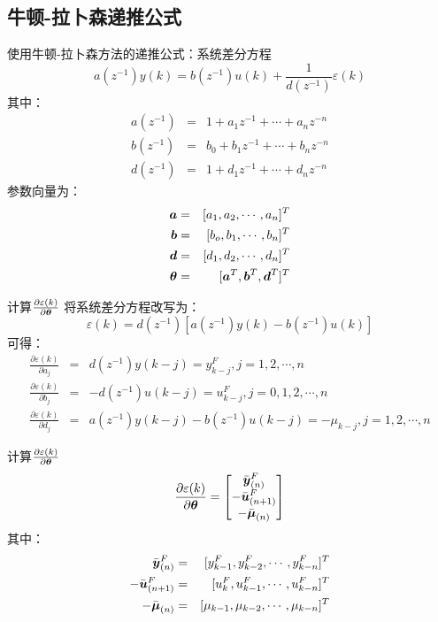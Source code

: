 \subsection{牛顿-拉卜森递推公式}

\begin{frame}{使用牛顿-拉卜森方法的递推公式：系统差分方程}
$$
a(z^{-1})y(k) = b(z^{-1})u(k)+\frac{1}{d(z^{-1})}\varepsilon(k)
$$
其中：
\begin{eqnarray*}
a(z^{-1}) &=&  1+a_1 z^{-1}+\cdots+a_nz^{-n} \\
b(z^{-1}) &=&  b_0+b_1 z^{-1}+\cdots+b_n z^{-n} \\
d(z^{-1}) &=&  1+d_1 z^{-1}+\cdots+d_n z^{-n} 
\end{eqnarray*}
参数向量为：
\begin{eqnarray*}
\boldsymbol{a} &=& [a_1,a_2,\cdots,a_n]^T   \\
\boldsymbol{b} &=& [b_o,b_1,\cdots,b_n]^T   \\
\boldsymbol{d} &=& [d_1,d_2,\cdots,d_n]^T   \\
\boldsymbol{\theta} &=& [\boldsymbol{a}^T,\boldsymbol{b}^T,\boldsymbol{d}^T]^T
\end{eqnarray*}
\end{frame}

\begin{frame}{计算$\frac{\partial\varepsilon(k)}{\partial\boldsymbol{\theta}}$}
将系统差分方程改写为：
$$
\varepsilon(k) = d(z^{-1})[a(z^{-1})y(k)-b(z^{-1})u(k)]
$$
可得：
\begin{eqnarray*}
\frac{\partial\varepsilon(k)}{\partial a_j} &=& d(z^{-1})y(k-j)=y^F_{k-j},j=1,2,\cdots,n\\
\frac{\partial\varepsilon(k)}{\partial b_j} &=& -d(z^{-1})u(k-j)=u^F_{k-j},j=0,1,2,\cdots,n\\
\frac{\partial\varepsilon(k)}{\partial d_j} &=& a(z^{-1})y(k-j)-b(z^{-1})u(k-j)=-\mu_{k-j},j=1,2,\cdots,n 
\end{eqnarray*}
\end{frame}

\begin{frame}{计算$\frac{\partial\varepsilon(k)}{\partial\boldsymbol{\theta}}$}
$$
\frac{\partial\varepsilon(k)}{\partial\boldsymbol{\theta}} = 
\begin{bmatrix}
\bar{\boldsymbol{y}}^F_{(n)} \\
-\bar{\boldsymbol{u}}^F_{(n+1)} \\
-\bar{\boldsymbol{\mu}}_{(n)}
\end{bmatrix}
$$
其中：
\begin{eqnarray*}
\bar{\boldsymbol{y}}^F_{(n)} &=& [y^F_{k-1}, y^F_{k-2}, \cdots , y^F_{k-n}]^T \\
-\bar{\boldsymbol{u}}^F_{(n+1)} &=& [u^F_k,  u^F_{k-1},\cdots, u^F_{k-n}]^T  \\
-\bar{\boldsymbol{\mu}}_{(n)}  &=& [\mu_{k-1},\mu_{k-2},\cdots, \mu_{k-n}]^T
\end{eqnarray*}
\end{frame}

